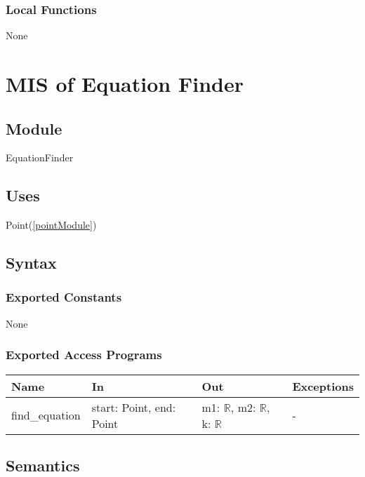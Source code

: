 \documentclass[12pt, titlepage]{article}
\begin{document}
\subsubsection{Local Functions}
None



\newpage
\section{MIS of Equation Finder} \label{equationFinder}

\subsection{Module}

EquationFinder

\subsection{Uses}
Point(\autoref{pointModule})

\subsection{Syntax}

\subsubsection{Exported Constants}

None

\subsubsection{Exported Access Programs}

\begin{center}
\begin{tabular}{p{4cm} p{2.3cm} p{3cm} p{4cm}}
\hline
\textbf{Name} & \textbf{In} & \textbf{Out} & \textbf{Exceptions} \\
\hline
find\_equation & start: Point, end: Point & m1: $\mathbb{R}$, m2: $\mathbb{R}$, k: $\mathbb{R}$ & - \\
\hline
\end{tabular}
\end{center}

\subsection{Semantics}
\end{document}
